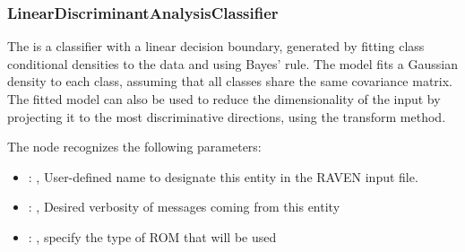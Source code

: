 

\subsubsection{LinearDiscriminantAnalysisClassifier}
  The  is a classifier with a linear decision
  boundary,     generated by fitting class conditional densities to the data and using Bayes' rule.
  The model fits a Gaussian density to each class, assuming that all classes share the same
  covariance matrix.     The fitted model can also be used to reduce the dimensionality of the input
  by projecting it to the most discriminative     directions, using the transform method.

  The  node recognizes the following parameters:
    \begin{itemize}
      \item {}: ,
        User-defined name to designate this entity in the RAVEN input file.
      \item {}: ,
        Desired verbosity of messages coming from this entity
      \item {}: ,
        specify the type of ROM that will be used
  \end{itemize}

